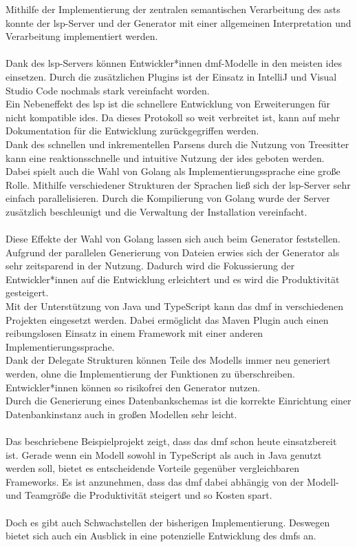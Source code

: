 \documentclass[./einleitung.tex]{subfiles}
\begin{document}
Mithilfe der Implementierung der zentralen semantischen Verarbeitung des \acrshort{ast}s konnte der \acrshort{lsp}-Server und der Generator mit einer allgemeinen Interpretation und Verarbeitung implementiert werden.
\\\\
Dank des \acrshort{lsp}-Servers können Entwickler*innen \acrshort{dmf}-Modelle in den meisten \acrshort{ide}s einsetzen.
Durch die zusätzlichen Plugins ist der Einsatz in IntelliJ und Visual Studio Code nochmals stark vereinfacht worden.\\
Ein Nebeneffekt des \acrshort{lsp} ist die schnellere Entwicklung von Erweiterungen für nicht kompatible \acrshort{ide}s.
Da dieses Protokoll so weit verbreitet ist, kann auf mehr Dokumentation für die Entwicklung zurückgegriffen werden.\\
Dank des schnellen und inkrementellen Parsens durch die Nutzung von Treesitter kann eine reaktionsschnelle und intuitive Nutzung der \acrshort{ide}s geboten werden.
Dabei spielt auch die Wahl von Golang als Implementierungssprache eine große Rolle.
Mithilfe verschiedener Strukturen der Sprachen ließ sich der \acrshort{lsp}-Server sehr einfach parallelisieren.
Durch die Kompilierung von Golang wurde der Server zusätzlich beschleunigt und die Verwaltung der Installation vereinfacht.
\\\\
Diese Effekte der Wahl von Golang lassen sich auch beim Generator feststellen.
Aufgrund der parallelen Generierung von Dateien erwies sich der Generator als sehr zeitsparend in der Nutzung.
Dadurch wird die Fokussierung der Entwickler*innen auf die Entwicklung erleichtert und es wird die Produktivität gesteigert.\\
Mit der Unterstützung von Java und TypeScript kann das \acrshort{dmf} in verschiedenen Projekten eingesetzt werden.
Dabei ermöglicht das Maven Plugin auch einen reibungslosen Einsatz in einem Framework mit einer anderen Implementierungssprache.\\
Dank der Delegate Strukturen können Teile des Modells immer neu generiert werden, ohne die Implementierung der Funktionen zu überschreiben.
Entwickler*innen können so risikofrei den Generator nutzen.\\
Durch die Generierung eines Datenbankschemas ist die korrekte Einrichtung einer Datenbankinstanz auch in großen Modellen sehr leicht.
\\\\
Das beschriebene Beispielprojekt zeigt, dass das \acrshort{dmf} schon heute einsatzbereit ist.
Gerade wenn ein Modell sowohl in TypeScript als auch in Java genutzt werden soll, bietet es entscheidende Vorteile gegenüber vergleichbaren Frameworks.
Es ist anzunehmen, dass das \acrshort{dmf} dabei abhängig von der Modell- und Teamgröße die Produktivität steigert und so Kosten spart.
\\\\
Doch es gibt auch Schwachstellen der bisherigen Implementierung.
Deswegen bietet sich auch ein Ausblick in eine potenzielle Entwicklung des \acrshort{dmf}s an.
\end{document}
